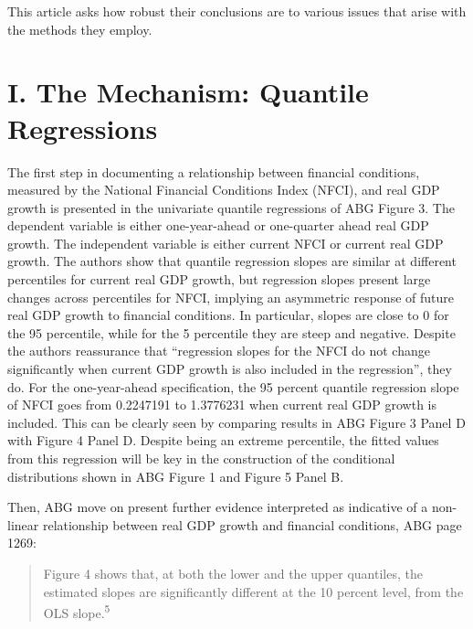 \documentclass[
  11pt,
]{article}
\begin{document}
This article asks how robust their conclusions are to various issues
that arise with the methods they employ.

\hypertarget{i.-the-mechanism-quantile-regressions}{%
\section{I. The Mechanism: Quantile
Regressions}\label{i.-the-mechanism-quantile-regressions}}

The first step in documenting a relationship between financial
conditions, measured by the National Financial Conditions Index (NFCI),
and real GDP growth is presented in the univariate quantile regressions
of ABG Figure 3. The dependent variable is either one-year-ahead or
one-quarter ahead real GDP growth. The independent variable is either
current NFCI or current real GDP growth. The authors show that quantile
regression slopes are similar at different percentiles for current real
GDP growth, but regression slopes present large changes across
percentiles for NFCI, implying an asymmetric response of future real GDP
growth to financial conditions. In particular, slopes are close to 0 for
the 95 percentile, while for the 5 percentile they are steep and
negative. Despite the authors reassurance that ``regression slopes for
the NFCI do not change significantly when current GDP growth is also
included in the regression'', they do. For the one-year-ahead
specification, the 95 percent quantile regression slope of NFCI goes
from 0.2247191 to 1.3776231 when current real GDP growth is included.
This can be clearly seen by comparing results in ABG Figure 3 Panel D
with Figure 4 Panel D. Despite being an extreme percentile, the fitted
values from this regression will be key in the construction of the
conditional distributions shown in ABG Figure 1 and Figure 5 Panel B.

Then, ABG move on present further evidence interpreted as indicative of
a non-linear relationship between real GDP growth and financial
conditions, ABG page 1269:

\begin{quote}
Figure 4 shows that, at both the lower and the upper quantiles, the
estimated slopes are significantly different at the 10 percent level,
from the OLS slope.\textsuperscript{5}
\end{quote}
\end{document}
